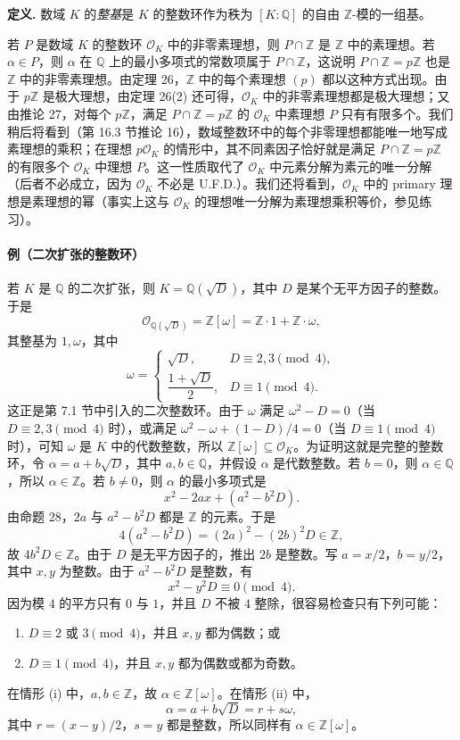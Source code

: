 \noindent\textbf{定义.} 数域 $K$ 的\emph{整基}是 $K$ 的整数环作为秩为 $[K:\mathbb Q]$ 的自由 $\mathbb Z$-模的一组基。

若 $P$ 是数域 $K$ 的整数环 $\mathcal O_K$ 中的非零素理想，则 $P\cap\mathbb Z$ 是 $\mathbb Z$ 中的素理想。若 $\alpha\in P$，则 $\alpha$ 在 $\mathbb Q$ 上的最小多项式的常数项属于 $P\cap\mathbb Z$，这说明 $P\cap\mathbb Z=p\mathbb Z$ 也是 $\mathbb Z$ 中的非零素理想。由定理 26，$\mathbb Z$ 中的每个素理想 $(p)$ 都以这种方式出现。由于 $p\mathbb Z$ 是极大理想，由定理 26(2) 还可得，$\mathcal O_K$ 中的非零素理想都是极大理想；又由推论 27，对每个 $p\mathbb Z$，满足 $P\cap\mathbb Z=p\mathbb Z$ 的 $\mathcal O_K$ 中素理想 $P$ 只有有限多个。我们稍后将看到（第 16.3 节推论 16），数域整数环中的每个非零理想都能唯一地写成素理想的乘积；在理想 $p\mathcal O_K$ 的情形中，其不同素因子恰好就是满足 $P\cap\mathbb Z=p\mathbb Z$ 的有限多个 $\mathcal O_K$ 中理想 $P$。这一性质取代了 $\mathcal O_K$ 中元素分解为素元的唯一分解（后者不必成立，因为 $\mathcal O_K$ 不必是 U.F.D.）。我们还将看到，$\mathcal O_K$ 中的 primary 理想是素理想的幂（事实上这与 $\mathcal O_K$ 的理想唯一分解为素理想乘积等价，参见练习）。

\paragraph{例（二次扩张的整数环）}
若 $K$ 是 $\mathbb Q$ 的二次扩张，则 $K=\mathbb Q(\sqrt D)$，其中 $D$ 是某个无平方因子的整数。于是
\[
\mathcal O_{\mathbb Q(\sqrt D)}=\mathbb Z[\omega]=\mathbb Z\cdot1+\mathbb Z\cdot\omega,
\]
其整基为 $1,\omega$，其中
\[
\omega=
\begin{cases}
	\sqrt D,& D\equiv2,3\pmod4,\\[2mm]
	\dfrac{1+\sqrt D}{2},& D\equiv1\pmod4.
\end{cases}
\]
这正是第 7.1 节中引入的二次整数环。由于 $\omega$ 满足 $\omega^2-D=0$（当 $D\equiv2,3\pmod4$ 时），或满足 $\omega^2-\omega+(1-D)/4=0$（当 $D\equiv1\pmod4$ 时），可知 $\omega$ 是 $K$ 中的代数整数，所以 $\mathbb Z[\omega]\subseteq\mathcal O_K$。为证明这就是完整的整数环，令 $\alpha=a+b\sqrt D$，其中 $a,b\in\mathbb Q$，并假设 $\alpha$ 是代数整数。若 $b=0$，则 $\alpha\in\mathbb Q$，所以 $\alpha\in\mathbb Z$。若 $b\ne0$，则 $\alpha$ 的最小多项式是
\[
x^2-2ax+(a^2-b^2D).
\]
由命题 28，$2a$ 与 $a^2-b^2D$ 都是 $\mathbb Z$ 的元素。于是
\[
4(a^2-b^2D)=(2a)^2-(2b)^2D\in\mathbb Z,
\]
故 $4b^2D\in\mathbb Z$。由于 $D$ 是无平方因子的，推出 $2b$ 是整数。写 $a=x/2$，$b=y/2$，其中 $x,y$ 为整数。由于 $a^2-b^2D$ 是整数，有
\[
x^2-y^2D\equiv0\pmod4.
\]
因为模 $4$ 的平方只有 $0$ 与 $1$，并且 $D$ 不被 $4$ 整除，很容易检查只有下列可能：
\begin{enumerate}[label=(\roman*)]
	\item $D\equiv2$ 或 $3\pmod4$，并且 $x,y$ 都为偶数；或
	\item $D\equiv1\pmod4$，并且 $x,y$ 都为偶数或都为奇数。
\end{enumerate}
在情形 (i) 中，$a,b\in\mathbb Z$，故 $\alpha\in\mathbb Z[\omega]$。在情形 (ii) 中，
\[
\alpha=a+b\sqrt D=r+s\omega,
\]
其中 $r=(x-y)/2$，$s=y$ 都是整数，所以同样有 $\alpha\in\mathbb Z[\omega]$。

